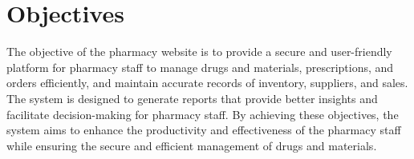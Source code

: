 \section{Objectives}


\hspace{1cm} The objective of the pharmacy website is to provide a secure and user-friendly platform for pharmacy staff to manage drugs and materials, prescriptions, and orders efficiently, and maintain
accurate records of inventory, suppliers, and sales. The system is designed to generate reports
that provide better insights and facilitate decision-making for pharmacy staff. By achieving these
objectives, the system aims to enhance the productivity and effectiveness of the pharmacy staff while ensuring the secure and efficient management of drugs and materials.